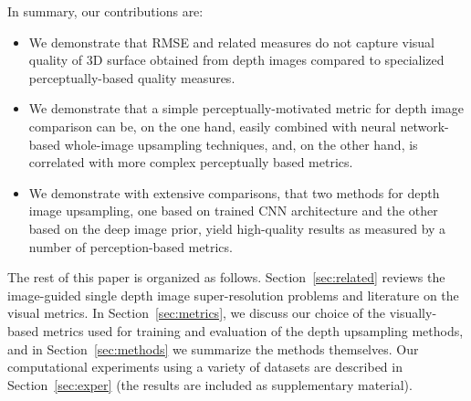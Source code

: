 In summary, our contributions are:
\begin{itemize}
    \item We demonstrate that RMSE and related measures do not capture   visual quality of 3D surface obtained from depth images compared to 
    specialized perceptually-based quality measures.
    \item We demonstrate that a simple perceptually-motivated metric for depth image comparison can be, on the one hand, easily combined with neural network-based whole-image upsampling techniques, and, on the other hand, is correlated with more complex perceptually based metrics.
    \item  We demonstrate with extensive comparisons, that two methods for depth image upsampling, one based on trained CNN architecture %
    and the other based on the deep image prior, yield high-quality results as measured by a number of perception-based metrics.
\end{itemize}

The rest of this paper is organized as follows. Section~\ref{sec:related} 
reviews the image-guided single depth image super-resolution problems
and literature on the visual metrics. In Section~\ref{sec:metrics},
we discuss our choice of the visually-based metrics used for training
and evaluation of the depth upsampling methods, 
and in Section~\ref{sec:methods} we summarize the methods themselves. Our computational experiments using a variety of datasets are described in Section~\ref{sec:exper} (the results are included as supplementary material).
